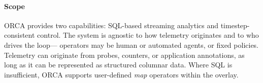 
\paragraph{Scope}
ORCA provides two capabilities: SQL-based streaming analytics and timestep-consistent control.
The system is agnostic to how telemetry originates and to who drives the loop---
operators may be human or automated agents, or fixed policies.
Telemetry can originate from probes, counters, or application annotations, as long as it can be
represented as structured columnar data.
Where SQL is insufficient, ORCA supports user-defined \emph{map} operators within the overlay.



